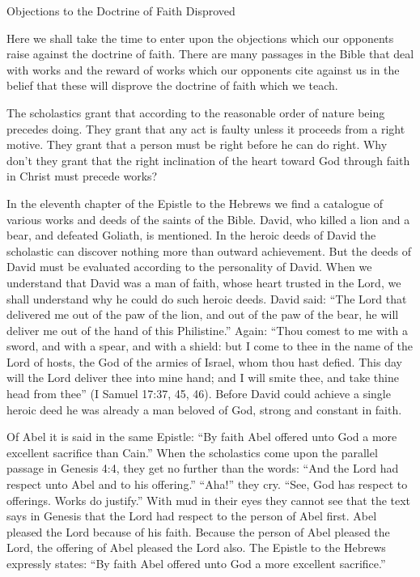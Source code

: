 Objections to the Doctrine of Faith Disproved

Here we shall take the time to enter upon the objections which our opponents raise against the doctrine of faith. There are many passages in the Bible that deal with works and the reward of works which our opponents cite against us in the belief that these will disprove the doctrine of faith which we teach.

The scholastics grant that according to the reasonable order of nature being precedes doing. They grant that any act is faulty unless it proceeds from a right motive. They grant that a person must be right before he can do right. Why don’t they grant that the right inclination of the heart toward God through faith in Christ must precede works?

In the eleventh chapter of the Epistle to the Hebrews we find a catalogue of various works and deeds of the saints of the Bible. David, who killed a lion and a bear, and defeated Goliath, is mentioned. In the heroic deeds of David the scholastic can discover nothing more than outward achievement. But the deeds of David must be evaluated according to the personality of David. When we understand that David was a man of faith, whose heart trusted in the Lord, we shall understand why he could do such heroic deeds. David said: “The Lord that delivered me out of the paw of the lion, and out of the paw of the bear, he will deliver me out of the hand of this Philistine.” Again: “Thou comest to me with a sword, and with a spear, and with a shield: but I come to thee in the name of the Lord of hosts, the God of the armies of Israel, whom thou hast defied. This day will the Lord deliver thee into mine hand; and I will smite thee, and take thine head from thee” (I Samuel 17:37, 45, 46). Before David could achieve a single heroic deed he was already a man beloved of God, strong and constant in faith.

Of Abel it is said in the same Epistle: “By faith Abel offered unto God a more excellent sacrifice than Cain.” When the scholastics come upon the parallel passage in Genesis 4:4, they get no further than the words: “And the Lord had respect unto Abel and to his offering.” “Aha!” they cry. “See, God has respect to offerings. Works do justify.” With mud in their eyes they cannot see that the text says in Genesis that the Lord had respect to the person of Abel first. Abel pleased the Lord because of his faith. Because the person of Abel pleased the Lord, the offering of Abel pleased the Lord also. The Epistle to the Hebrews expressly states: “By faith Abel offered unto God a more excellent sacrifice.”

